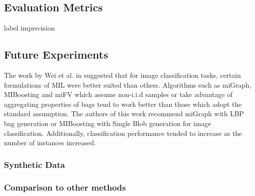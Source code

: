 \subsection{Evaluation Metrics}

label imprecision

\subsection{Future Experiments}

The work by Wei et al. in \cite{Wei2016ImageBagGenerators} suggested that  for image classification tasks, certain formulations of MIL were better suited than others.  Algorithms such as miGraph, MIBoosting and miFV which assume non-i.i.d samples or take advantage of aggregating properties of bags tend to work better than those which adopt the standard assumption.  The authors of this work recommend miGraph with LBP bag generation or MIBoosting with Single Blob generation for image classification.  Additionally, classification performance tended to increase as the number of instances increased.

\subsubsection{Synthetic Data}

\subsubsection{Comparison to other methods}